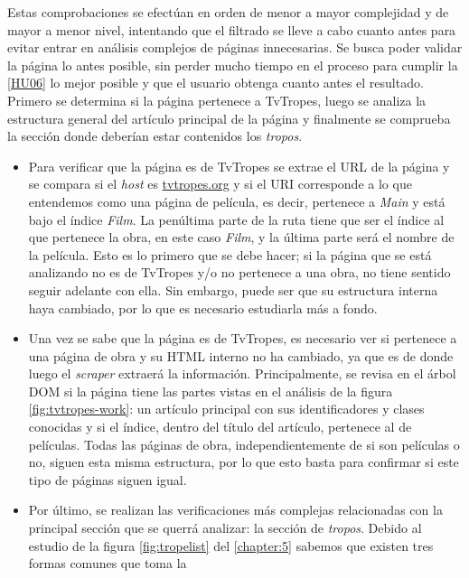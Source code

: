 Estas comprobaciones se efectúan en orden de menor a mayor complejidad y de
mayor a menor nivel, intentando que el filtrado se lleve a cabo cuanto antes
para evitar entrar en análisis complejos de páginas innecesarias. Se busca poder
validar la página lo antes posible, sin perder mucho tiempo en el proceso para
cumplir la \href{https://github.com/jlgallego99/TropesToGo/issues/45}{[HU06]} lo
mejor posible y que el usuario obtenga cuanto antes el resultado. Primero se
determina si la página pertenece a TvTropes, luego se analiza la estructura
general del artículo principal de la página y finalmente se comprueba la sección
donde deberían estar contenidos los \textit{tropos}.
\begin{itemize}
    \item Para verificar que la página es de TvTropes se extrae el URL de la
    página y se compara si el \textit{host} es \url{tvtropes.org} y si el URI
    corresponde a lo que entendemos como una página de película, es decir,
    pertenece a \textit{Main} y está bajo el índice \textit{Film}. La penúltima
    parte de la ruta tiene que ser el índice al que pertenece la obra, en este
    caso \textit{Film}, y la última parte será el nombre de la película. Esto es
    lo primero que se debe hacer; si la página que se está analizando no es de
    TvTropes y/o no pertenece a una obra, no tiene sentido seguir adelante con
    ella. Sin embargo, puede ser que su estructura interna haya cambiado, por lo
    que es necesario estudiarla más a fondo.
    \item Una vez se sabe que la página es de TvTropes, es necesario ver si
    pertenece a una página de obra y su HTML interno no ha cambiado, ya que es
    de donde luego el \textit{scraper} extraerá la información. Principalmente,
    se revisa en el árbol DOM si la página tiene las partes vistas en el
    análisis de la figura \ref{fig:tvtropes-work}: un artículo principal con sus
    identificadores y clases conocidas y si el índice, dentro del título del
    artículo, pertenece al de películas. Todas las páginas de obra,
    independientemente de si son películas o no, siguen esta misma estructura,
    por lo que esto basta para confirmar si este tipo de páginas siguen igual.
    \item Por último, se realizan las verificaciones más complejas relacionadas
    con la principal sección que se querrá analizar: la sección de
    \textit{tropos}. Debido al estudio de la figura \ref{fig:tropelist} del
    \autoref{chapter:5} sabemos que existen tres formas comunes que toma la

\end{itemize}
